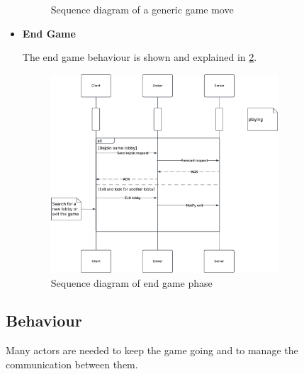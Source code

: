 \documentclass{scrartcl}
\begin{document}
\begin{itemize}
\begin{figure}
                  \caption{Sequence diagram of a generic game move}
                  \label{fig:game-move}
            \end{figure}
      \item \textbf{End Game} \par
            The end game behaviour is shown and explained in \cref{fig:end-game}.
            \begin{figure}
                  \centering
                  \includegraphics[width=0.8\textwidth]{figures/sequenceEndGame.png}
                  \caption{Sequence diagram of end game phase}
                  \label{fig:end-game}
            \end{figure}
\end{itemize}
\newpage
\subsection{Behaviour}\label{behaviour}

Many actors are needed to keep the game going and to manage the communication between them.
\end{document}
